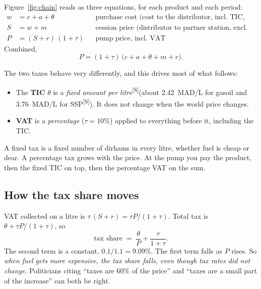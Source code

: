 \documentclass[11pt,a4paper]{article}
\newcommand{\tagS}{\textsuperscript{\textcolor{orange!80!black}{\textsf{\scriptsize[S]}}}}
\theoremstyle{definition}
\begin{document}
Figure~\ref{fig:chain} reads as three equations, for each product and each period:
\begin{align}
w &= c + a + \theta &&\text{purchase cost (cost to the distributor, incl.\ TIC, excl.\ VAT)}\label{eq:w}\\
S &= w + m &&\text{cession price (distributor to partner station, excl.\ VAT)}\label{eq:S}\\
P &= (S + r)\,(1+\tau) &&\text{pump price, incl.\ VAT}\label{eq:P}
\end{align}
Combined,
\begin{equation}\label{eq:build}
P = (1+\tau)\,\big(c + a + \theta + m + r\big).
\end{equation}

The two taxes behave very differently, and this drives most of what follows:
\begin{itemize}
\item The \textbf{TIC} $\theta$ is a \emph{fixed amount per litre}\tagS (about 2.42~MAD/L for gasoil
  and 3.76~MAD/L for SSP\tagS). It does not change when the world price changes.
\item \textbf{VAT} is a \emph{percentage} ($\tau=10\%$) applied to everything before it, including the TIC.
\end{itemize}

\begin{intuition}
A fixed tax is a fixed number of dirhams in every litre, whether fuel is cheap or dear. A
percentage tax grows with the price. At the pump you pay the product, then the fixed TIC on top,
then the percentage VAT on the sum.
\end{intuition}

\subsection{How the tax share moves}

VAT collected on a litre is $\tau\,(S+r) = \tau P/(1+\tau)$. Total tax is $\theta + \tau P/(1+\tau)$, so
\begin{equation}\label{eq:taxshare}
\text{tax share} \;=\; \frac{\theta}{P} + \frac{\tau}{1+\tau}.
\end{equation}
The second term is a constant, $0.1/1.1 = 9.09\%$. The first term falls as $P$ rises. So \emph{when fuel
gets more expensive, the tax \emph{share} falls, even though tax rates did not change}. Politicians citing
``taxes are 60\% of the price'' and ``taxes are a small part of the increase'' can both be right.
\end{document}
